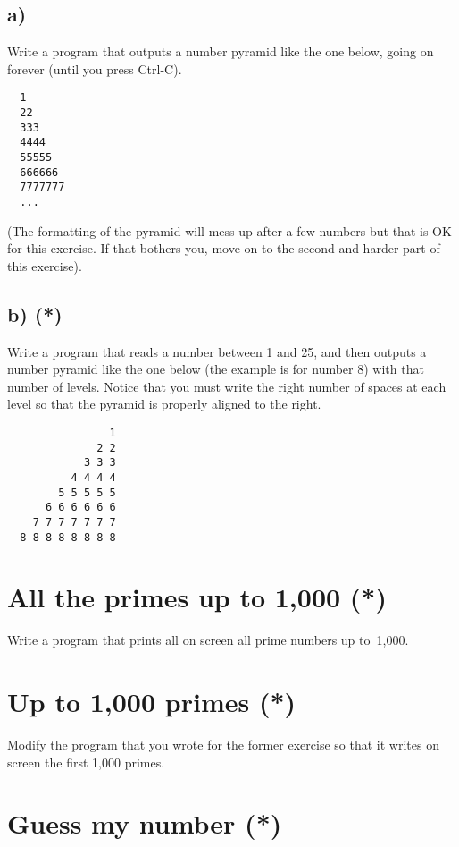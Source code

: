 \documentclass{article}
\begin{document}
\subsection*{a)}
\label{sec:number-pyramidsa}

Write a program that outputs a number pyramid like the one below,
going on forever (until you press Ctrl-C). 

\begin{verbatim}
  1
  22
  333
  4444
  55555
  666666
  7777777
  ...
\end{verbatim}

(The formatting of the pyramid will mess up after a few numbers but
that is OK for this exercise. If that bothers you, move on to the
second and harder part of this exercise). 

\subsection*{b) (*)}
\label{sec:number-pyramidsb}

Write a program that reads a number between 1 and 25, and then outputs
a number pyramid like the one below (the example is for number 8) with
that number of levels. Notice that you must write the right number of
spaces at each level so that the pyramid is properly aligned to the
right. 

\begin{verbatim}
                1
              2 2
            3 3 3
          4 4 4 4
        5 5 5 5 5
      6 6 6 6 6 6 
    7 7 7 7 7 7 7
  8 8 8 8 8 8 8 8
\end{verbatim}

\section{All the primes up to 1,000 (*)}
\label{sec:all-primes-up}

Write a program that prints all on screen all prime numbers up
to~1,000. 

\section{Up to 1,000 primes (*)}
\label{sec:all-primes-uprr}

Modify the program that you wrote for the former exercise so that it
writes on screen the first 1,000 primes. 

\section{Guess my number (*)}
\label{sec:guess-my-number}
\end{document}
